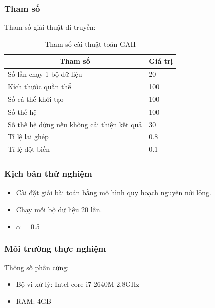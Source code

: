 \begin{frame}
    \frametitle{Tham số}
    Tham số giải thuật di truyền:
    \begin{table}[H]
        \begin{tabularx}{\textwidth}{|X|X|}
            \hline
            \multicolumn{1}{|c|}{\textbf{Tham số}} & \multicolumn{1}{c|}{\textbf{Giá trị}}                    \\ \hline
            Số lần chạy 1 bộ dữ liệu  &  20                                                 \\ \hline
            Kích thước quần thể  & 100                                                      \\ \hline
            Số cá thể khởi tạo & 100                                                        \\ \hline
            Số thế hệ & 100                                                                 \\ \hline
            Số thế hệ dừng nếu không cải thiện kết quả & 30                                 \\ \hline
            Tỉ lệ lai ghép & 0.8                                                            \\ \hline
            Tỉ lệ đột biến   & 0.1                                                          \\ \hline
        \end{tabularx}
        \caption{Tham số cài thuật toán GAH}
    \end{table}
\end{frame}

\begin{frame}
    \frametitle{Kịch bản thử nghiệm}
    
    \begin{itemize}
        \item Cài đặt giải bài toán bằng mô hình quy hoạch nguyên nới lỏng.
        \item Chạy mỗi bộ dữ liệu 20 lần.
        \item $\alpha$ = 0.5
    \end{itemize}
\end{frame}

\begin{frame}
    \frametitle{Môi trường thực nghiệm}
    Thông số phần cứng:
    \begin{itemize}
        \item Bộ vi xử lý: Intel core i7-2640M 2.8GHz
        \item RAM: 4GB    
    \end{itemize}
\end{frame}

